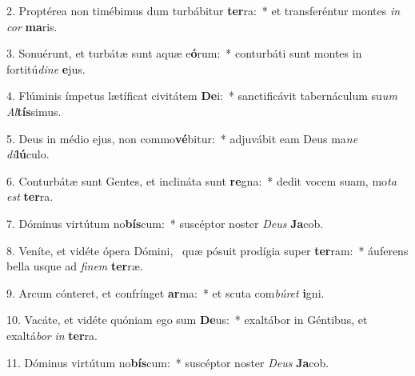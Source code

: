 2. Proptérea non timébimus dum turbábitur \textbf{ter}ra:~*  et transferéntur montes \textit{in} \textit{cor} \textbf{ma}ris.\

3. Sonuérunt, et turbátæ sunt aquæ e\textbf{ó}rum:~*  conturbáti sunt montes in fortitú\textit{di}\textit{ne} \textbf{e}jus.\

4. Flúminis ímpetus lætíficat civitátem \textbf{De}i:~*  sanctificávit tabernáculum su\textit{um} \textit{Al}\textbf{tís}simus.\

5. Deus in médio ejus, non commo\textbf{vé}bitur:~*  adjuvábit eam Deus ma\textit{ne} \textit{di}\textbf{lú}culo.\

6. Conturbátæ sunt Gentes, et inclináta sunt \textbf{re}gna:~*  dedit vocem suam, mo\textit{ta} \textit{est} \textbf{ter}ra.\

7. Dóminus virtútum no\textbf{bís}cum:~*  suscéptor noster \textit{De}\textit{us} \textbf{Ja}cob.\

8. Veníte, et vidéte ópera Dómini, \dag\  quæ pósuit prodígia super \textbf{ter}ram:~*  áuferens bella usque ad \textit{fi}\textit{nem} \textbf{ter}ræ.\

9. Arcum cónteret, et confrínget \textbf{ar}ma:~*  et scuta com\textit{bú}\textit{ret} \textbf{i}gni.\

10. Vacáte, et vidéte quóniam ego sum \textbf{De}us:~*  exaltábor in Géntibus, et exaltá\textit{bor} \textit{in} \textbf{ter}ra.\

11. Dóminus virtútum no\textbf{bís}cum:~*  suscéptor noster \textit{De}\textit{us} \textbf{Ja}cob.\

